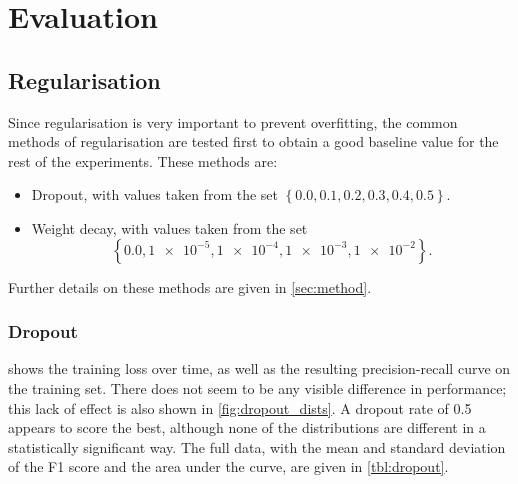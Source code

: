 \section{Evaluation}
\FloatBarrier%

\subsection{Regularisation}
Since regularisation is very important to prevent overfitting, the common
methods of regularisation are tested first to obtain a good baseline value for the
rest of the experiments. These methods are:
\begin{itemize}
  \item Dropout, with values taken from the set
    $\left\{0.0, 0.1, 0.2, 0.3, 0.4, 0.5\right\}$.
  \item Weight decay, with values taken from the set
    \[
      \left\{0.0, \num{1e-5}, \num{1e-4}, \num{1e-3}, \num{1e-2}\right\}.
    \]
\end{itemize}
Further details on these methods are given in \cref{sec:method}.

\subsubsection{Dropout}
 shows the training loss over time, as well as the
resulting precision-recall curve on the training set. There does not seem to be
any visible difference in performance; this lack of effect is also
shown in \cref{fig:dropout_dists}. A dropout rate of 0.5 appears to score the
best, although none of the distributions are different in a statistically
significant way. The full data, with the mean and standard deviation of the F1
score and the area under the curve, are given in
\cref{tbl:dropout}.

